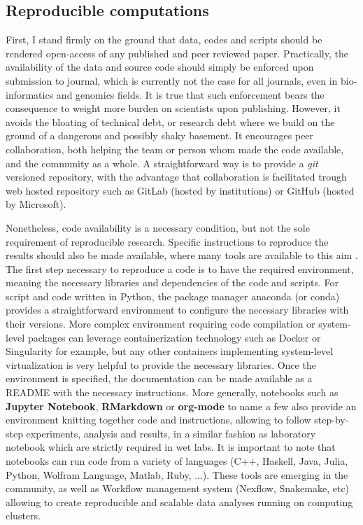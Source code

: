 \subsection{Reproducible computations}
First, I stand firmly on the ground that data, codes and scripts should be rendered open-access of any published and peer reviewed paper.
Practically, the availability of the data and source code should simply be enforced upon submission to journal, which is currently not the case for all journals, even in bio-informatics and genomics fields.
It is true that such enforcement bears the consequence to weight more burden on scientists upon publishing.
However, it avoids the bloating of technical debt, or research debt where we build on the ground of a dangerous and possibly shaky basement.
It encourages peer collaboration, both helping the team or person whom made the code available, and the community as a whole.
A straightforward way is to provide a \textit{git} versioned repository, with the advantage that collaboration is facilitated trough web hosted repository such as GitLab (hosted by institutions) or GitHub (hosted by Microsoft).

Nonetheless, code availability is a necessary condition, but not the sole requirement of reproducible research.
Specific instructions to reproduce the results should also be made available, where many tools are available to this aim \citep{Wilson2014,Darriba2018}.
The first step necessary to reproduce a code is to have the required environment, meaning the necessary libraries and dependencies of the code and scripts.
For script and code written in Python, the package manager anaconda (or conda) provides a straightforward environment to configure the necessary libraries with their versions. 
More complex environment requiring code compilation or system-level packages can leverage containerization technology such as Docker or Singularity for example, but any other containers implementing system-level virtualization is very helpful to provide the necessary libraries.
Once the environment is specified, the documentation can be made available as a README with the necessary instructions.
More generally, notebooks such as \textbf{Jupyter Notebook}, \textbf{RMarkdown} or \textbf{org-mode} to name a few also provide an environment knitting together code and instructions, allowing to follow step-by-step experiments, analysis and results, in a similar fashion as laboratory notebook which are strictly required in wet labs.
It is important to note that notebooks can run code from a variety of languages (C++, Haskell, Java, Julia, Python, Wolfram Language, Matlab, Ruby, ...).
These tools are emerging in the community, as well as Workflow management system (Nexflow, Snakemake, etc) allowing to create reproducible and scalable data analyses running on computing clusters.

